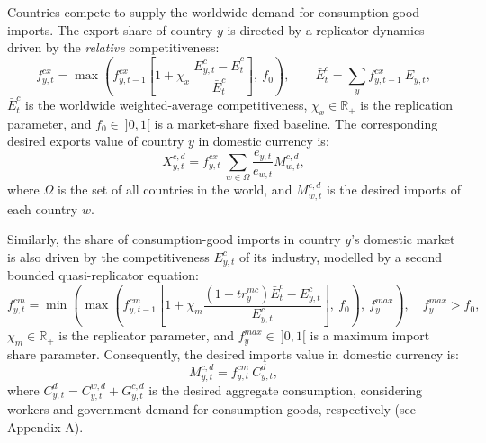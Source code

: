 \documentclass[a4paper,11pt]{article}
\begin{document}
Countries compete to supply the worldwide demand for consumption-good imports. The export share of country $y$ is directed by a replicator dynamics driven by the \emph{relative} competitiveness:
\begin{equation}
	f_{y,t}^{cx} = \max \left( f_{y,t-1}^{cx} \left[ 1 + \chi_x ~ \dfrac{ E_{y,t}^c - \bar{E}_t^c }{ \bar{E}_t^c } \right], ~ f_0 \right), \qquad \bar{E}_t^c = \sum_{ y } f_{y,t-1}^{cx} ~ E_{y,t},
\end{equation}
$\bar{E}_t^c$ is the worldwide weighted-average competitiveness, $\chi_x \in \mathbb{R}_+$ is the replication parameter, and $f_0 \in ~ ]0, 1[$ is a market-share fixed baseline. The corresponding desired exports value of country $y$ in domestic currency is:
\begin{equation}
	X_{y,t}^{c,d} = f_{y,t}^{cx} ~ \sum_{w \in \Omega} \dfrac{ e_{y,t} }{ e_{w,t} } M_{w,t}^{c,d},
\end{equation}
where $\Omega$ is the set of all countries in the world, and $M_{w,t}^{c,d}$ is the desired imports of each country $w$.

Similarly, the share of consumption-good imports in country $y$'s domestic market is also driven by the competitiveness $E_{y,t}^c$ of its industry, modelled by a second bounded quasi-replicator equation:
\begin{equation}
	f_{y,t}^{cm} = \min \left( \max \left( f_{y,t-1}^{cm} \left[ 1 + \chi_m \frac{ \left( 1 - {tr}_y^{mc} \right) \bar{E}_t^c - E_{y,t}^c }{ E_{y,t}^c } \right], ~ f_0 \right), ~ f_y^{max} \right), \quad f_y^{max} > f_0,
\end{equation}
$\chi_m \in \mathbb{R}_+$ is the replicator parameter, and $f_y^{max} \in ~ ]0, 1[$ is a maximum import share parameter. Consequently, the desired imports value in domestic currency is:
\begin{equation}
	M_{y,t}^{c,d} = f_{y,t}^{cm} ~ C_{y,t}^d,
\end{equation}
where $C_{y,t}^d = C_{y,t}^{w,d} + G_{y,t}^{c,d}$ is the desired aggregate consumption, considering workers and government demand for consumption-goods, respectively (see Appendix A).
\end{document}
